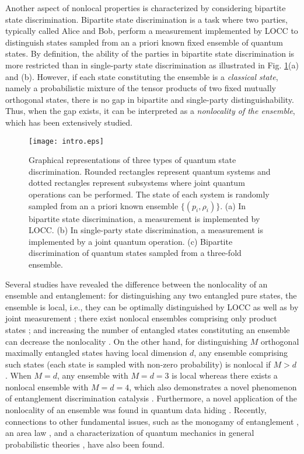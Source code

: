 \documentclass[aps,prx,twocolumn,showpacs,amsmath,notitlepage,amssymb,superscriptaddress]{revtex4-1}
\begin{document}
Another aspect of nonlocal properties is characterized by considering bipartite state discrimination. Bipartite state discrimination is a task where two parties, typically called Alice and Bob, perform a measurement implemented by LOCC to distinguish states sampled from an a priori known fixed ensemble of quantum states. By definition, the ability of the parties in bipartite state discrimination is more restricted than in single-party state discrimination as illustrated in Fig. \ref{fig:intro}(a) and (b). However, if each state constituting the ensemble is a {\it classical state}, namely a probabilistic mixture of the tensor products of two fixed mutually orthogonal states, there is no gap in bipartite and single-party distinguishability. Thus, when the gap exists, it can be interpreted as a {\it nonlocality of the ensemble}, which has been extensively studied.

\begin{figure}
 \centering
  \texttt{[image: intro.eps]}
  \caption{Graphical representations of three types of quantum state discrimination. Rounded rectangles represent quantum systems and dotted rectangles represent subsystems where joint quantum operations can be performed. The state of each system is randomly sampled from an a priori known ensemble $\{(p_i,\rho_i)\}$. (a) In bipartite state discrimination, a measurement is implemented by LOCC. (b) In single-party state discrimination, a measurement is implemented by a joint quantum operation. (c) Bipartite discrimination of quantum states sampled from a three-fold ensemble.}
\label{fig:intro}
\end{figure} 

Several studies have revealed the difference between the nonlocality of an ensemble and entanglement: for distinguishing any two entangled pure states, the ensemble is local, i.e., they can be optimally distinguished by LOCC as well as by joint measurement \cite{twostatediscrimination1, twostatediscrimination2}; there exist nonlocal ensembles comprising only product states \cite{productstate1, productstate2,productstate3,productstate4,productstate5}; and increasing the number of entangled states constituting an ensemble can decrease the nonlocality \cite{localdiscrimination}.
On the other hand, for distinguishing $M$ orthogonal maximally entangled states having local dimension $d$, any ensemble comprising such states (each state is sampled with non-zero probability) is nonlocal if $M>d$ \cite{optimalprob1, optimalprob2, optimalprob3, optimalprob4}. When $M=d$, any ensemble with $M=d=3$ is local \cite{optimalprob2} whereas there exists a nonlocal ensemble with $M=d=4$, which also demonstrates a novel phenomenon of entanglement discrimination catalysis \cite{optimalprob5}.
Furthermore, a novel application of the nonlocality of an ensemble was found in quantum data hiding \cite{datahiding1,datahiding2}. Recently, connections to other fundamental issues, such as the monogamy of entanglement \cite{datahidingstate2}, an area law \cite{datahidingstate3}, and a characterization of quantum mechanics in general probabilistic theories \cite{GPTs}, have also been found.
\end{document}
